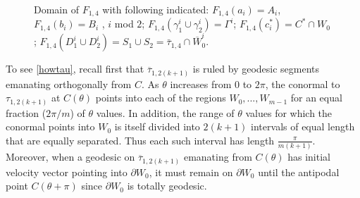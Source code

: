 \documentclass[11pt, reqno]{amsart}
\numberwithin{equation}{section}
\begin{document}
   \begin{figure}
	\centering
	\resizebox{3in}{!}{}
	\caption[Domain of$F_{1,4}$]{Domain of ${F}_{1,4}$ with following indicated: $F_{1,4}(a_i)=A_i$, $F_{1,4}(b_i)=B_i$ ,  $i$ mod $2$;
	 $F_{1,4}(\gamma_1^i\cup \gamma_2^i)=\Gamma^i$; 
	 ${F}_{1,4}(c_i^*)=C^*\cap W_{0}$;  
	 $F_{1,4}(D_1^i\cup D_2^i)=S_1\cup S_2=\bar{\tau}_{1,4}\cap \overline{W}_0^i$.
	 }
	\label{GammaParamFig}
\end{figure}


To see \eqref{howtau}, recall first that $\overline{\tau}_{1,2(k+1)}$ is ruled by geodesic segments emanating orthogonally from $C$.   As $\theta$ increases from $0$ to $2\pi$, the conormal to $\tau_{1,2(k+1)}$ at $C(\theta)$ points into each of the regions $W_0,...,W_{m-1}$ for an equal fraction ($2\pi/m$) of $\theta$ values. In addition, the range of $\theta$ values for which the conormal points into $W_0$ is itself divided into $2(k+1)$ intervals of equal length that are equally separated.  Thus each such interval has length $\frac{\pi}{m(k+1)}$.  Moreover, when a geodesic on $\overline{\tau}_{1,2(k+1)}$ emanating from $C(\theta)$ has initial velocity vector pointing into $\partial W_0$, it must remain on $\partial W_0$ until the antipodal point $C(\theta+\pi)$ since $\partial W_0$ is totally geodesic.  
\end{document}
